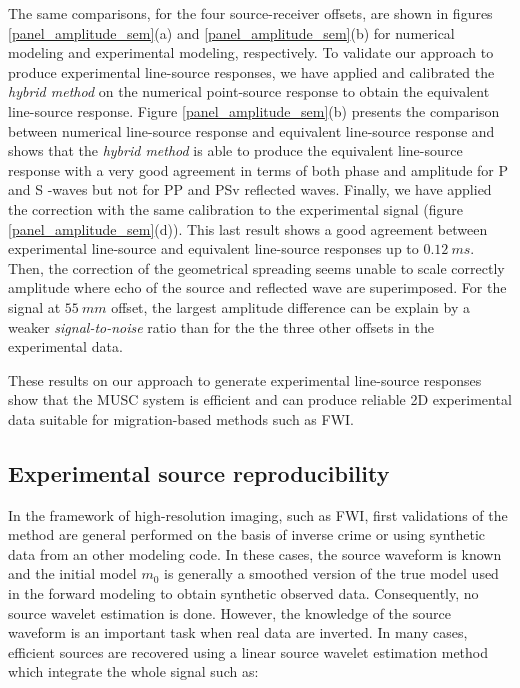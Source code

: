 \documentclass[manuscript,revised]{geophysics}
\begin{document}
\noindent The same comparisons, for the four source-receiver offsets, are shown in figures \ref{panel_amplitude_sem}(a) and \ref{panel_amplitude_sem}(b) for numerical modeling and experimental modeling, respectively. To validate our approach to produce experimental line-source responses, we have applied and calibrated the \textit{hybrid method} \citep{Forbriger_LSS_2014,Schafer_LSS_2014} on the numerical point-source response to obtain the equivalent line-source response. Figure \ref{panel_amplitude_sem}(b) presents the comparison between numerical line-source response and equivalent line-source response and shows that the \textit{hybrid method} is able to produce the equivalent line-source response with a very good agreement in terms of both phase and amplitude for P and S -waves but not for PP and PSv reflected waves. Finally, we have applied the correction with the same calibration to the experimental signal (figure \ref{panel_amplitude_sem}(d)). This last result shows a good agreement between experimental line-source and equivalent line-source responses up to $0.12\ ms$. Then, the correction of the geometrical spreading seems unable to scale correctly amplitude where echo of the source and reflected wave are superimposed. For the signal at $55\ mm$ offset, the largest amplitude difference can be explain by a weaker \textit{signal-to-noise} ratio than for the the three other offsets in the experimental data.  

\noindent These results on our approach to generate experimental line-source responses show that the MUSC system is efficient and can produce reliable 2D experimental data suitable for migration-based methods such as FWI.


\subsection{Experimental source reproducibility}

\noindent In the framework of high-resolution imaging, such as FWI, first validations of the method are general performed on the basis of inverse crime or using synthetic data from an other modeling code. In these cases, the source waveform is known and the initial model $m_{0}$ is generally a smoothed version of the true model used in the forward modeling to obtain synthetic observed data. Consequently, no source wavelet estimation is done. However, the knowledge of the source waveform is an important task when real data are inverted. In many cases, efficient sources are recovered using a linear source wavelet estimation method  \citep{Pratt_FWI_1999} which integrate the whole signal such as:
\end{document}
